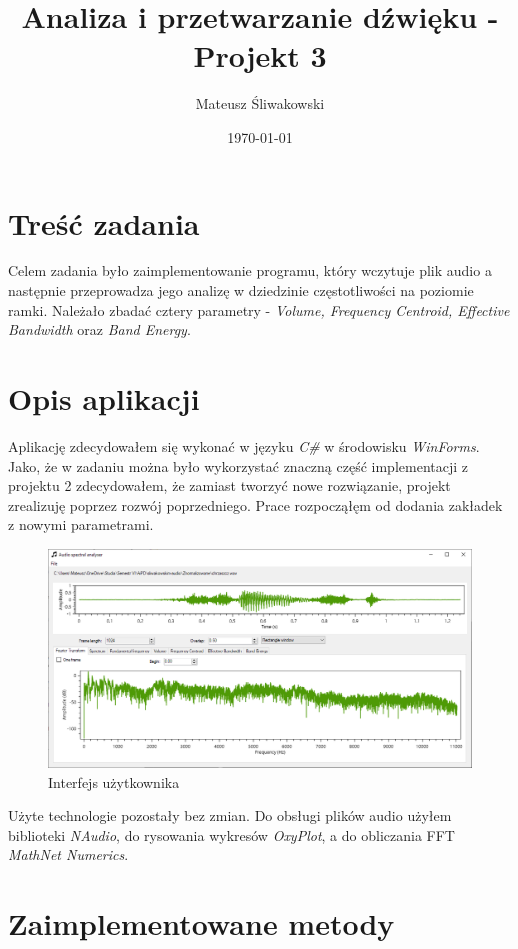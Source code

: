 \documentclass{article}
\title{Analiza i przetwarzanie dźwięku - Projekt 3}
\date{\today}
\author{Mateusz Śliwakowski}
\begin{document}
  \maketitle
  
\section{Treść zadania}
Celem zadania było zaimplementowanie programu, który wczytuje plik audio a następnie przeprowadza jego analizę w dziedzinie częstotliwości na poziomie ramki. Należało zbadać cztery parametry - \textit{Volume, Frequency Centroid, Effective Bandwidth} oraz \textit{Band Energy}.

\section{Opis aplikacji}

Aplikację zdecydowałem się wykonać w języku \textit{C\#} w środowisku \textit{WinForms}. Jako, że w zadaniu można było wykorzystać znaczną część implementacji z projektu 2 zdecydowałem, że zamiast tworzyć nowe rozwiązanie, projekt zrealizuję poprzez rozwój poprzedniego. Prace rozpocząłęm od dodania zakładek z nowymi parametrami.

\begin{figure}[H]
\includegraphics[width=6in]{scr1.png}
\centering
\caption{Interfejs użytkownika}
\label{fig:interface}
\end{figure}

Użyte technologie pozostały bez zmian. Do obsługi plików audio użyłem biblioteki \textit{NAudio}, do rysowania wykresów \textit{OxyPlot}, a do obliczania FFT \textit{MathNet Numerics}.

\section{Zaimplementowane metody}
\end{document}
